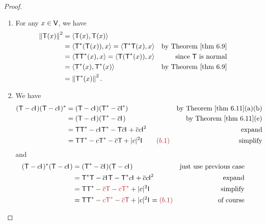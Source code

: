 \begin{proof} \ 

\begin{enumerate}
\item For any \(x \in \textsf{V}\), we have
\begin{align*}
    \norm{\T(x)}^2 & = \LG \T(x), \T(x) \RG \\
        & = \LG \T^*(\T(x)), x \RG = \LG \T^*\T(x), x \RG & \text{by \THM{6.9}} \\
        & = \LG \T\T^*(x), x \RG = \LG \T(\T^*(x)), x \RG & \text{since \(\T\) is normal} \\
        & = \LG \T^*(x), \T^*(x) \RG & \text{by \THM{6.9}} \\
        & = \norm{\T^*(x)}^2.
\end{align*}

\item We have
\begin{align*}
    (\T - c\ITRAN{})(\T - c\ITRAN{})^*
        & = (\T - c\ITRAN{})(\T^* - \conjugatet{c}\ITRAN{}^*) & \text{by \THM{6.11}(a)(b)} \\
        & = (\T - c\ITRAN{})(\T^* - \conjugatet{c}\ITRAN{}) & \text{by \THM{6.11}(e)} \\
        & = \T\T^* - c\ITRAN{}\T^* - \T\conjugatet{c}\ITRAN{} + \conjugatet{c}c\ITRAN{}^2 & \text{expand} \\
        & = \T\T^* - c\T^* - \conjugatet{c}\T + \abs{c}^2\ITRAN{} \quad \quad \MAROON{(b.1)} & \text{simplify}
\end{align*}
and 
\begin{align*}
    (\T - c\ITRAN{})^*(\T - c\ITRAN{})
        & = (\T^* - \conjugatet{c}\ITRAN{})(\T - c\ITRAN{}) & \text{just use previous case} \\
        & = \T^*\T - \conjugatet{c}\ITRAN{}\T - \T^*c\ITRAN{} + \conjugatet{c}c\ITRAN{}^2 & \text{expand} \\
        & = \T\T^* - \MAROON{\conjugatet{c}\T} - \RED{c\T^*} + \abs{c}^2\ITRAN{} & \text{simplify} \\
        & = \T\T^* - \RED{c\T^*} - \MAROON{\conjugatet{c}\T} + \abs{c}^2\ITRAN{} = \MAROON{(b.1)} & \text{of course}
\end{align*}


\end{enumerate}
\end{proof}
